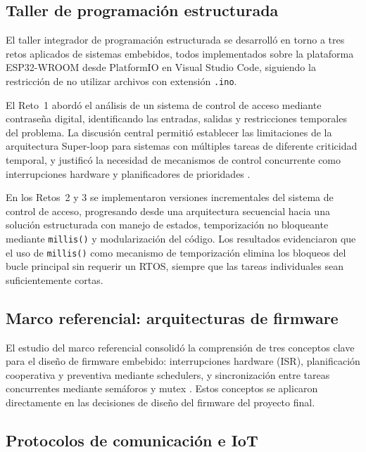 \setlength{\parskip}{6pt}
\setlength{\parindent}{15pt}

\subsection{Taller de programación estructurada}

El taller integrador de programación estructurada se desarrolló en torno a tres retos aplicados de sistemas embebidos, todos implementados sobre la plataforma ESP32-WROOM desde PlatformIO en Visual Studio Code, siguiendo la restricción de no utilizar archivos con extensión \texttt{.ino}.

El Reto~1 abordó el análisis de un sistema de control de acceso mediante contraseña digital, identificando las entradas, salidas y restricciones temporales del problema. La discusión central permitió establecer las limitaciones de la arquitectura Super-loop para sistemas con múltiples tareas de diferente criticidad temporal, y justificó la necesidad de mecanismos de control concurrente como interrupciones hardware y planificadores de prioridades \cite{wirth_2022_superloop}.

En los Retos~2 y 3 se implementaron versiones incrementales del sistema de control de acceso, progresando desde una arquitectura secuencial hacia una solución estructurada con manejo de estados, temporización no bloqueante mediante \texttt{millis()} y modularización del código. Los resultados evidenciaron que el uso de \texttt{millis()} como mecanismo de temporización elimina los bloqueos del bucle principal sin requerir un RTOS, siempre que las tareas individuales sean suficientemente cortas.

\subsection{Marco referencial: arquitecturas de firmware}

El estudio del marco referencial consolidó la comprensión de tres conceptos clave para el diseño de firmware embebido: interrupciones hardware (ISR), planificación cooperativa y preventiva mediante schedulers, y sincronización entre tareas concurrentes mediante semáforos y mutex \cite{sergio_2015_interrupciones} \cite{ortega_2019_scheduler} \cite{pez_2025_sincronizacion}. Estos conceptos se aplicaron directamente en las decisiones de diseño del firmware del proyecto final.

\subsection{Protocolos de comunicación e IoT}

